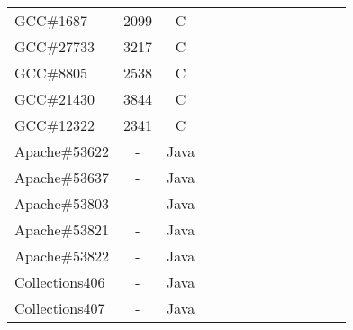 \begin{table}[h!]
\begin{tabular}{lcccccccccccc}
    GCC\#1687         &  2099  & C  &  &              &    &                                 &                   &                           &                               \\
    GCC\#27733        &  3217  & C  &  &              &    &                                 &                   &                           &                               \\
    GCC\#8805         &  2538  & C  &  &              &    &                                 &                   &                           &                                \\
    GCC\#21430        &  3844  & C  &  &              &    &                                 &                   &                           &                                \\
    GCC\#12322        &  2341  & C  &  &              &    &                                 &                   &                           &                               \\
    \midrule
    \midrule
    Apache\#53622     &  -  & Java  &  &              &    &                                 &                   &                           &                               \\
    Apache\#53637     &  -  & Java  &  &              &    &                                 &                   &                           &                              \\
    Apache\#53803     &  -  & Java  &  &              &    &                                 &                   &                           &                                \\
    Apache\#53821     &  -  & Java  &  &              &    &                                 &                   &                           &                               \\
    Apache\#53822     &  -  & Java  &  &              &    &                                 &                   &                           &                                \\
    \midrule
    Collections406    &  -  & Java  &  &              &    &                                 &                   &                           &                               \\
    Collections407    &  -  & Java  &  &              &    &                                 &                   &                           &                              \\

\end{tabular}
\end{table}

